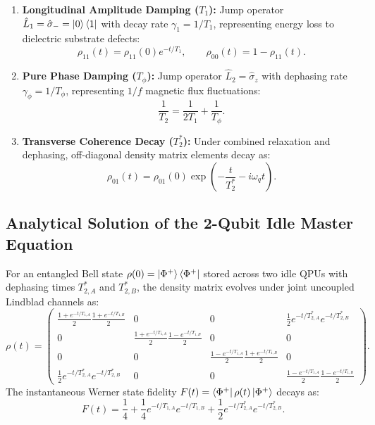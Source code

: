 \begin{enumerate}
    \item \textbf{Longitudinal Amplitude Damping ($T_1$):} Jump operator $\hat{L}_1 = \hat{\sigma}_- = \ket{0}\bra{1}$ with decay rate $\gamma_1 = 1/T_1$, representing energy loss to dielectric substrate defects:
    \begin{equation}
        \rho_{11}(t) = \rho_{11}(0) e^{-t/T_1}, \qquad \rho_{00}(t) = 1 - \rho_{11}(t).
    \end{equation}
    
    \item \textbf{Pure Phase Damping ($T_\phi$):} Jump operator $\hat{L}_2 = \hat{\sigma}_z$ with dephasing rate $\gamma_\phi = 1/T_\phi$, representing $1/f$ magnetic flux fluctuations:
    \begin{equation}
        \frac{1}{T_2} = \frac{1}{2T_1} + \frac{1}{T_\phi}.
    \end{equation}
    
    \item \textbf{Transverse Coherence Decay ($T_2^*$):} Under combined relaxation and dephasing, off-diagonal density matrix elements decay as:
    \begin{equation}
        \rho_{01}(t) = \rho_{01}(0) \exp\left( - \frac{t}{T_2^*} - i \omega_q t \right).
        \label{eq:t2_decay_formula_ch09}
    \end{equation}
\end{enumerate}

\subsection{Analytical Solution of the 2-Qubit Idle Master Equation}
For an entangled Bell state $\rho(0) = \ket{\Phi^+}\bra{\Phi^+}$ stored across two idle QPUs with dephasing times $T_{2, A}^*$ and $T_{2, B}^*$, the density matrix evolves under joint uncoupled Lindblad channels as:
\begin{equation}
    \rho(t) = \begin{pmatrix}
        \frac{1 + e^{-t/T_{1,A}}}{2}\frac{1 + e^{-t/T_{1,B}}}{2} & 0 & 0 & \frac{1}{2} e^{-t/T_{2,A}^*} e^{-t/T_{2,B}^*} \\
        0 & \frac{1 + e^{-t/T_{1,A}}}{2}\frac{1 - e^{-t/T_{1,B}}}{2} & 0 & 0 \\
        0 & 0 & \frac{1 - e^{-t/T_{1,A}}}{2}\frac{1 + e^{-t/T_{1,B}}}{2} & 0 \\
        \frac{1}{2} e^{-t/T_{2,A}^*} e^{-t/T_{2,B}^*} & 0 & 0 & \frac{1 - e^{-t/T_{1,A}}}{2}\frac{1 - e^{-t/T_{1,B}}}{2}
    \end{pmatrix}.
\end{equation}
The instantaneous Werner state fidelity $F(t) = \bra{\Phi^+}\rho(t)\ket{\Phi^+}$ decays as:
\begin{equation}
    F(t) = \frac{1}{4} + \frac{1}{4} e^{-t/T_{1,A}} e^{-t/T_{1,B}} + \frac{1}{2} e^{-t/T_{2,A}^*} e^{-t/T_{2,B}^*}.
    \label{eq:bell_decay_exact_ch09}
\end{equation}


